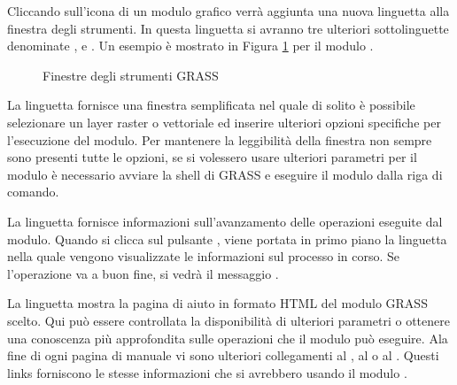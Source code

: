 Cliccando sull'icona di un modulo grafico verrà aggiunta una nuova linguetta
alla finestra degli strumenti. In questa linguetta si avranno tre ulteriori
sottolinguette denominate ,  e . Un
esempio è mostrato in Figura \ref{fig:grass_module_dialog} per il modulo
.

\begin{figure}[h]
\centering
\caption{Finestre degli strumenti GRASS \nixcaption}\label{fig:grass_module_dialog}
   \goodgap
   \goodgap
\end{figure}


La linguetta  fornisce una finestra semplificata nel quale di
solito è possibile selezionare un layer raster o vettoriale ed inserire
ulteriori opzioni specifiche per l'esecuzione del modulo. Per mantenere la
leggibilità della finestra non sempre sono presenti tutte le opzioni, se si
volessero usare ulteriori parametri per il modulo è necessario avviare la
shell di GRASS e eseguire il modulo dalla riga di comando.


La linguetta  fornisce informazioni sull'avanzamento delle
operazioni eseguite dal modulo. Quando si clicca sul pulsante ,
viene portata in primo piano la linguetta  nella quale vengono
visualizzate le informazioni sul processo in corso. Se l'operazione va a buon
fine, si vedrà il messaggio .


La linguetta  mostra la pagina di aiuto in formato HTML del modulo
GRASS scelto. Qui può essere controllata la disponibilità di ulteriori
parametri o ottenere una conoscenza più approfondita sulle operazioni che il
modulo può eseguire. Ala fine di ogni pagina di manuale vi sono ulteriori
collegamenti al , al  o al
. Questi links forniscono le stesse informazioni che si
avrebbero usando il modulo .

